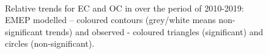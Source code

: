 \begin{figure}  %
  \\
\caption{Relative trends for EC and OC in \pmfine over the period of 2010-2019: EMEP modelled -- coloured contours (grey/white means non-significant trends) and observed - coloured triangles (significant) and circles (non-significant).}
\label{fig:ECOCtrends}
\end{figure}
